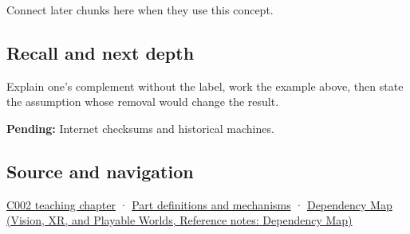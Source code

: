 \hypertarget{appendix-03c678cd40b3-used-by}{}

Connect later chunks here when they use this concept.

\subsection{Recall and next depth}\label{appendix-03c678cd40b3-recall-and-next-depth}

\hypertarget{appendix-03c678cd40b3-recall-and-next-depth}{}

Explain one's complement without the label, work the example above, then state the assumption whose removal would change the result.

\textbf{Pending:} Internet checksums and historical machines.

\subsection{Source and navigation}\label{appendix-03c678cd40b3-source-and-navigation}

\hypertarget{appendix-03c678cd40b3-source-and-navigation}{}

\hyperref[01-foundations-i-ch001-arithmetic-becomes-a-policy]{C002 teaching chapter} · \hyperref[appendix-fd090d982a15]{Part definitions and mechanisms} · \href{../07-Vision-XR-and-Playable-Worlds/main.pdf\#nameddest=appendix-4ad47bdd269a}{Dependency Map (Vision, XR, and Playable Worlds, Reference notes: Dependency Map)}
